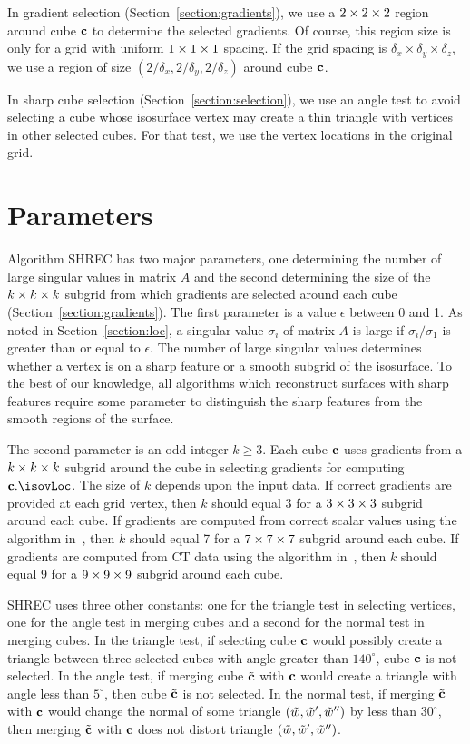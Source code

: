 In gradient selection (Section~\ref{section:gradients}),
we use a $2 \times 2 \times 2$ region around cube $\mathbf{c}$ to determine
the selected gradients.
Of course, this region size is only for a grid 
with uniform $1 \times 1 \times 1$ spacing.
If the grid spacing is $\delta_x \times \delta_y \times \delta_z$,
we use a region of size $(2/\delta_x, 2/\delta_y, 2/\delta_z)$
around cube $\mathbf{c}$.

In sharp cube selection (Section~\ref{section:selection}),
we use an angle test to avoid selecting a cube 
whose isosurface vertex may create a thin triangle 
with vertices in other selected cubes.
For that test,
we use the vertex locations in the original grid.


\section{Parameters}
\label{section:parameters}

Algorithm SHREC has two major parameters,
one determining the number of large singular values in matrix $A$
and the second determining the size of the $k \times k \times k$ subgrid 
from which gradients are selected around each cube
(Section~\ref{section:gradients}).
The first parameter is a value $\epsilon$ between 0 and 1.
As noted in Section~\ref{section:loc},
a singular value $\sigma_i$ of matrix $A$ 
is large if $\sigma_i/\sigma_1$ is greater than or equal to $\epsilon$.
The number of large singular values determines whether a vertex
is on a sharp feature or a smooth subgrid of the isosurface.
To the best of our knowledge, all algorithms which reconstruct surfaces 
with sharp features require some parameter
to distinguish the sharp features from the smooth regions of the surface.

The second parameter is an odd integer $k \ge 3$.
Each cube $\mathbf{c}$ uses gradients from a $k \times k \times k$ subgrid around the cube
in selecting gradients for computing $\cb.\isovLoc$.
The size of $k$ depends upon the input data.
If correct gradients are provided at each grid vertex,
then $k$ should equal 3 for a $3 \times 3 \times 3$ subgrid around each cube.
If gradients are computed from correct scalar values 
using the algorithm in~\cite{bw-crgsd-15},
then $k$ should equal 7 for a $7 \times 7 \times 7$ subgrid around each cube.
If gradients are computed from CT data 
using the algorithm in~\cite{bw-crgsd-15},
then $k$ should equal 9 for a $9 \times 9 \times 9$ subgrid around each cube.

SHREC uses three other constants:
one for the triangle test in selecting vertices,
one for the angle test in merging cubes
and a second for the normal test in merging cubes.
In the triangle test,
if selecting cube $\mathbf{c}$ would possibly create a triangle between three
selected cubes with angle greater than $140^\circ$, 
cube $\mathbf{c}$ is not selected.
In the angle test,
if merging cube ${\tilde{\mathbf{c}}}$ with $\mathbf{c}$ would create a triangle with angle
less than $5^\circ$, then cube ${\tilde{\mathbf{c}}}$ is not selected.
In the normal test,
if merging ${\tilde{\mathbf{c}}}$ with $\mathbf{c}$ would change the normal 
of some triangle $(\tilde{w},\tilde{w}',\tilde{w}'')$ by less than $30^\circ$,
then merging ${\tilde{\mathbf{c}}}$ with $\mathbf{c}$ does not distort triangle $(\tilde{w},\tilde{w}',\tilde{w}'')$.

